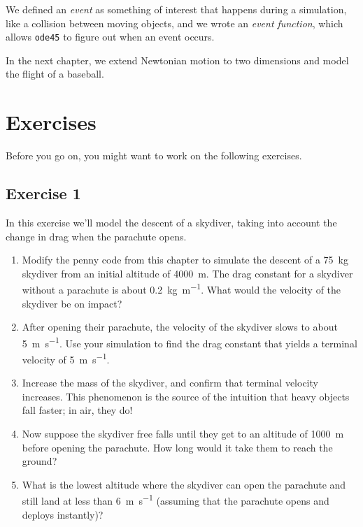 We defined an \emph{event} as something of interest that happens during a simulation, like a collision between moving objects, and we wrote an \emph{event function}, which allows \lstinline{ode45} to figure out when an event occurs.

In the next chapter, we extend Newtonian motion to two dimensions and model the flight of a baseball.


\section{Exercises}

Before you go on, you might want to work on the following exercises.

\subsection{Exercise 1}

In this exercise we'll model the descent of a skydiver, taking into account the change in drag when the parachute opens.

\begin{enumerate}

\item Modify the penny code from this chapter to simulate the descent of a \SI{75}{\kilogram} skydiver from an initial altitude of \SI{4000}{\meter}.
The drag constant for a skydiver without a parachute is about \SI{0.2}{\kilogram \per \meter}.
What would the velocity of the skydiver be on impact?
 
\item After opening their parachute, the velocity of the skydiver slows to about \SI{5}{\meter\per\second}.  Use your simulation to find the drag constant that yields a terminal velocity of \SI{5}{\meter\per\second}.

\item Increase the mass of the skydiver, and confirm that terminal velocity increases.  This phenomenon is the source of the intuition that heavy objects fall faster; in air, they do!

\item Now suppose the skydiver free falls until they get to an altitude of \SI{1000}{\meter} before opening the parachute.  How long would it take them to reach the ground?

\item What is the lowest altitude where the skydiver can open the parachute and still land at less than \SI{6}{\meter\per\second} (assuming that the parachute opens and deploys instantly)?

\end{enumerate}

